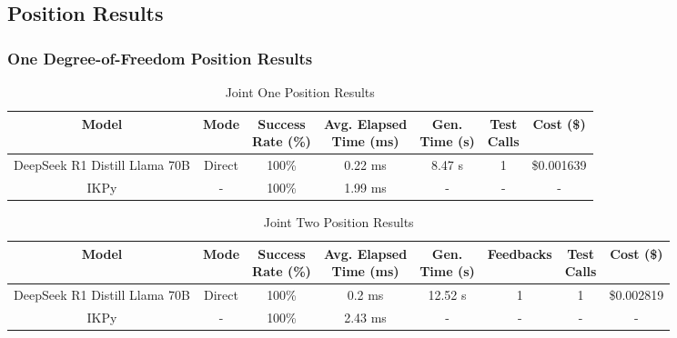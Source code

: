 \begin{landscape}

\subsection{Position Results}

\subsubsection{One Degree-of-Freedom Position Results}

\begin{table}[H]
\tiny
\renewcommand{\arraystretch}{1.2}
\caption{Joint One Position Results}
\begin{center}
\begin{tabular}{|c|c|c|c|c|c|c|}
    \hline
    \textbf{Model} & 
    \textbf{Mode} & 
    \makecell{\textbf{Success}\\\textbf{Rate (\%)}} &
    \makecell{\textbf{Avg. Elapsed}\\\textbf{Time (ms)}} &
    \makecell{\textbf{Gen.}\\\textbf{Time (s)}} &
    \makecell{\textbf{Test}\\\textbf{Calls}} &
    \textbf{Cost (\$)} \\
    \hline
    DeepSeek R1 Distill Llama 70B & Direct & 100\% & 0.22 ms & 8.47 s & 1 & \$0.001639 \\
    \hline
    IKPy & - & 100\% & 1.99 ms & - & - & - \\
    \hline
\end{tabular}
\label{Results-Position-1-1}
\end{center}
\end{table}

\begin{table}[H]
\tiny
\renewcommand{\arraystretch}{1.2}
\caption{Joint Two Position Results}
\begin{center}
\begin{tabular}{|c|c|c|c|c|c|c|c|}
    \hline
    \textbf{Model} & 
    \textbf{Mode} & 
    \makecell{\textbf{Success}\\\textbf{Rate (\%)}} &
    \makecell{\textbf{Avg. Elapsed}\\\textbf{Time (ms)}} &
    \makecell{\textbf{Gen.}\\\textbf{Time (s)}} &
    \textbf{Feedbacks} &
    \makecell{\textbf{Test}\\\textbf{Calls}} &
    \textbf{Cost (\$)} \\
    \hline
    DeepSeek R1 Distill Llama 70B & Direct & 100\% & 0.2 ms & 12.52 s & 1 & 1 & \$0.002819 \\
    \hline
    IKPy & - & 100\% & 2.43 ms & - & - & - & - \\
    \hline
\end{tabular}
\label{Results-Position-2-2}
\end{center}
\end{table}


\end{landscape}
